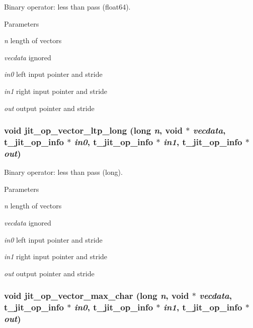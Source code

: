 Binary operator: less than pass (float64). 
\begin{DoxyParams}{Parameters}
\item[{\em n}]length of vectors \item[{\em vecdata}]ignored \item[{\em in0}]left input pointer and stride \item[{\em in1}]right input pointer and stride \item[{\em out}]output pointer and stride \end{DoxyParams}
\hypertarget{group__opvecmod_ga0d0a7fc3ff8faae67b16d6706dc35fd6}{
\subsubsection[{jit\_\-op\_\-vector\_\-ltp\_\-long}]{\setlength{\rightskip}{0pt plus 5cm}void jit\_\-op\_\-vector\_\-ltp\_\-long (long {\em n}, \/  void $\ast$ {\em vecdata}, \/  {\bf t\_\-jit\_\-op\_\-info} $\ast$ {\em in0}, \/  {\bf t\_\-jit\_\-op\_\-info} $\ast$ {\em in1}, \/  {\bf t\_\-jit\_\-op\_\-info} $\ast$ {\em out})}}
\label{group__opvecmod_ga0d0a7fc3ff8faae67b16d6706dc35fd6}


Binary operator: less than pass (long). 
\begin{DoxyParams}{Parameters}
\item[{\em n}]length of vectors \item[{\em vecdata}]ignored \item[{\em in0}]left input pointer and stride \item[{\em in1}]right input pointer and stride \item[{\em out}]output pointer and stride \end{DoxyParams}
\hypertarget{group__opvecmod_gae96a69930932256e39d2e637d3b97f80}{
\subsubsection[{jit\_\-op\_\-vector\_\-max\_\-char}]{\setlength{\rightskip}{0pt plus 5cm}void jit\_\-op\_\-vector\_\-max\_\-char (long {\em n}, \/  void $\ast$ {\em vecdata}, \/  {\bf t\_\-jit\_\-op\_\-info} $\ast$ {\em in0}, \/  {\bf t\_\-jit\_\-op\_\-info} $\ast$ {\em in1}, \/  {\bf t\_\-jit\_\-op\_\-info} $\ast$ {\em out})}}
\label{group__opvecmod_gae96a69930932256e39d2e637d3b97f80}


